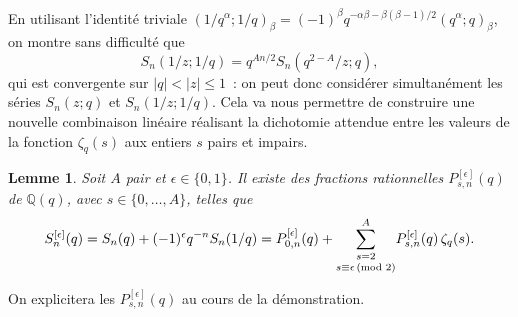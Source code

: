 \documentclass[12pt]{amsart}
\newcommand{\al}{\alpha}
\newcommand{\be}{\beta}
\newcommand{\ep}{\epsilon}
\newtheorem{lem}{Lemme}
\theoremstyle{remark}
\numberwithin{equation}{section}
\begin{document}
En utilisant l'identit{\'e} triviale 
$(1/q^{\alpha};1/q)_{\beta}=(-1)^{\beta}q^{-\al\be -
\be(\be-1)/2}(q^{\al};q)_{\be}$, on montre sans difficult{\'e} que 
$$
S_n(1/z;1/q)=q^{An/2}S_n(q^{2-A}/z;q),
$$
qui est convergente sur  
$\vert q\vert <\vert z\vert \le 1$~: on peut donc consid{\'e}rer 
simultan{\'e}ment les s{\'e}ries 
$S_n(z;q)$ et $S_n(1/z;1/q)$. Cela va nous permettre de 
construire une nouvelle combinaison lin{\'e}aire r{\'e}alisant la 
dichotomie attendue entre les valeurs de la fonction $\zeta_q(s)$ aux entiers $s$ pairs et impairs. 

\begin{lem}\label{lem:dichoto}
Soit $A$ pair et $\ep\in\{0,1\}$. 
Il existe des fractions rationnelles $P_{s,n}^{[\ep]}(q)$ de $\mathbb{Q}(q)$, 
avec $s\in\{0,\ldots, A\}$,  
telles que 
$$
S_n^{[\ep]}(q)=S_n(q)+(-1)^{\ep}q^{-n}S_n(1/q)=
P_{0,n}^{[\ep]}(q)+
\underset{s\equiv \ep\,(\textup {mod }2)}{\sum_{{s=2}}^{A}} 
P_{s,n}^{[\ep]}(q)\,\zeta_q(s).
$$
\end{lem}
On explicitera les  $P_{s,n}^{[\ep]}(q)$ au cours de la d{\'e}monstration. 
\end{document}
